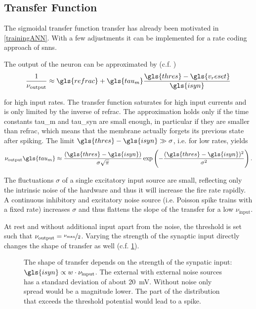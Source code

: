 \subsection{Transfer Function}

The sigmoidal transfer function \gls{transfer} has already been motivated in \cref{trainingANN}. With a few adjustments it can be implemented for a rate coding approach of \glspl{snn}.

The output of the neuron can be approximated by (c.f. \cite{brunel2000dynamics})
\begin{equation}\label{fireratehigh}
\frac{1}{\nu_\text{output}} \approx \gls{refrac} + \gls{tau_m} \frac{\gls{thres} - \gls{v_reset}}{\gls{isyn}}
\end{equation}

for high input rates. The transfer function saturates for high input currents and is only limited by the inverse of \gls{refrac}. The approximation holds only if the time constants \gls{tau_m} and \gls{tau_syn} are small enough, in particular if they are smaller than \gls{refrac}, which means that the membrane actually forgets its previous state after spiking. The limit $\gls{thres} - \gls{isyn} \gg \sigma$, i.e. for low rates, yields
\begin{equation}\label{fireratelow}
\nu_\text{output} \gls{tau_m} \approx \frac{(\gls{thres} - \gls{isyn})}{\sigma \sqrt{\pi}} \exp\left(-\frac{(\gls{thres} - \gls{isyn})^2}{\sigma^2}\right).
\end{equation}

The fluctuations $\sigma$ of a single excitatory input source are small, reflecting only the intrinsic noise of the hardware and thus it will increase the fire rate rapidly. A continuous inhibitory and excitatory noise source (i.e. Poisson spike trains with a fixed rate) increases $\sigma$ and thus flattens the slope of the \gls{transfer} for a low $\nu_\text{input}$. 

At rest and without additional input apart from the noise, the threshold is set such that $\nu_\text{output} = \nicefrac{\nu_\text{max}}{2}$. Varying the strength of the synaptic input directly changes the shape of \gls{transfer} as well (c.f. \cref{transferfunction}).

\begin{figure}
	\label{transferfunction}
	\begin{center}
		
	\end{center}
	\caption{The shape of \gls{transfer} depends on the strength of the synpatic input: $\gls{isyn} \propto w \cdot \nu_\text{input}$. The external  with external noise sources has a standard deviation of about \SI{20}{\milli\V}. Without noise only spread would be a magnitude lower. The part of the distribution that exceeds the threshold potential would lead to a spike.}
\end{figure}

